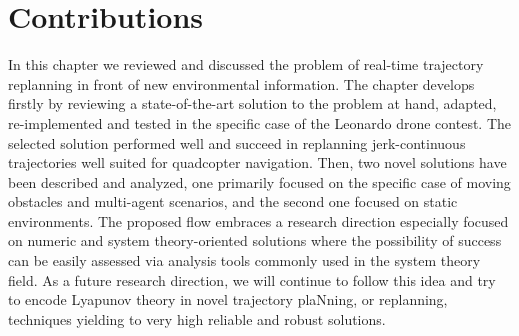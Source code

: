 \section{Contributions}
In this chapter we reviewed and discussed the problem of real-time trajectory replanning in front of new environmental information.
The chapter develops firstly by reviewing a state-of-the-art solution to the problem at hand, adapted, re-implemented and tested in the
specific case of the Leonardo drone contest. The selected solution performed well and succeed in replanning jerk-continuous trajectories
well suited for quadcopter navigation. Then, two novel solutions have been described and analyzed, one primarily focused on the specific
case of moving obstacles and multi-agent scenarios, and the second one focused on static environments.
The proposed flow embraces a research direction especially focused on numeric and system theory-oriented solutions where the possibility
of success can be easily assessed via analysis tools commonly used in the system theory field.
As a future research direction, we will continue to follow this idea and try to encode Lyapunov theory in novel trajectory
plaNning, or replanning, techniques yielding to very high reliable and robust solutions.

